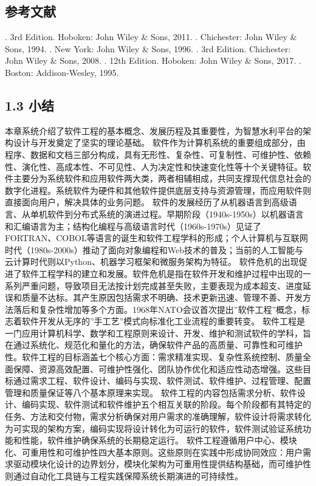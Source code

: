 \subsection{参考文献}\label{ux53c2ux8003ux6587ux732e-1} . 3rd Edition. Hoboken: John Wiley \& Sons, 2011. . Chichester: John
Wiley \& Sons, 1994. . New York: John Wiley \& Sons, 1996. . 3rd Edition. Chichester: John Wiley \& Sons, 2008. . 12th
Edition. Hoboken: John Wiley \& Sons, 2017. . Boston: Addison-Wesley, 1995. \subsection{1.3 小结}\label{ux5c0fux7ed3}
本章系统介绍了软件工程的基本概念、发展历程及其重要性，为智慧水利平台的架构设计与开发奠定了坚实的理论基础。
软件作为计算机系统的重要组成部分，由程序、数据和文档三部分构成，具有无形性、复杂性、可复制性、可维护性、依赖性、演化性、高成本性、不可见性、人为决定性和快速变化性等十个关键特征。软件主要分为系统软件和应用软件两大类，两者相辅相成，共同支撑现代信息社会的数字化进程。系统软件为硬件和其他软件提供底层支持与资源管理，而应用软件则直接面向用户，解决具体的业务问题。
软件的发展经历了从机器语言到高级语言、从单机软件到分布式系统的演进过程。早期阶段（1940s-1950s）以机器语言和汇编语言为主；结构化编程与高级语言时代（1960s-1970s）见证了FORTRAN、COBOL等语言的诞生和软件工程学科的形成；个人计算机与互联网时代（1980s-2000s）推动了面向对象编程和Web技术的普及；当前的人工智能与云计算时代则以Python、机器学习框架和微服务架构为特征。
软件危机的出现促进了软件工程学科的建立和发展。软件危机是指在软件开发和维护过程中出现的一系列严重问题，导致项目无法按计划完成甚至失败，主要表现为成本超支、进度延误和质量不达标。其产生原因包括需求不明确、技术更新迅速、管理不善、开发方法落后和复杂性增加等多个方面。1968年NATO会议首次提出''软件工程''概念，标志着软件开发从无序的''手工艺''模式向标准化工业流程的重要转变。
软件工程是一门应用计算机科学、数学和工程原则来设计、开发、维护和测试软件的学科，旨在通过系统化、规范化和量化的方法，确保软件产品的高质量、可靠性和可维护性。软件工程的目标涵盖七个核心方面：需求精准实现、复杂性系统控制、质量全面保障、资源高效配置、可维护性强化、团队协作优化和适应性动态增强。这些目标通过需求工程、软件设计、编码与实现、软件测试、软件维护、过程管理、配置管理和质量保证等八个基本原理来实现。
软件工程的内容包括需求分析、软件设计、编码实现、软件测试和软件维护五个相互关联的阶段。每个阶段都有其特定的任务、方法和交付物，需求分析确保对用户需求的准确理解，软件设计将需求转化为可实现的架构方案，编码实现将设计转化为可运行的软件，软件测试验证系统功能和性能，软件维护确保系统的长期稳定运行。
软件工程遵循用户中心、模块化、可重用性和可维护性四大基本原则。这些原则在实践中形成协同效应：用户需求驱动模块化设计的边界划分，模块化架构为可重用性提供结构基础，而可维护性则通过自动化工具链与工程实践保障系统长期演进的可持续性。
